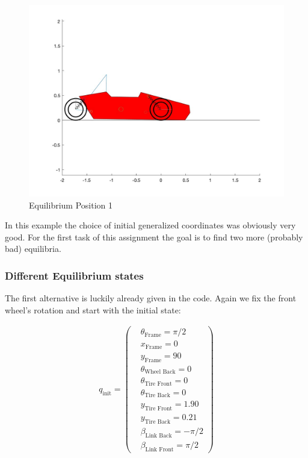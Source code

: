 \begin{figure}[ht]
    \centering
    \includegraphics[scale=0.235]{images/Equilibrium1.jpg}
    \caption{Equilibrium Position 1}
    \label{fig:eq_1}
\end{figure}

\noindent In this example the choice of initial generalized coordinates was obviously very good. For the first task of this assignment the goal is to find two more (probably bad) equilibria.



\subsubsection{Different Equilibrium states}

The first alternative is luckily already given in the code. Again we fix the front wheel's rotation and start with the initial state:

\begin{equation}\label{eq:4.5.3}
    \begin{split}
        q_{\text{init}} = 
        \begin{pmatrix}
            &\theta_{\text{Frame}} = \pi/2\\
            &x_{\text{Frame}} = 0\\
            &y_{\text{Frame}} = 90\\
            &\theta_{\text{Wheel Back}} = 0\\
            &\theta_{\text{Tire Front}} = 0\\
            &\theta_{\text{Tire Back}} = 0\\
            &y_{\text{Tire Front}} = 1.90\\
            &y_{\text{Tire Back}} = 0.21\\
            &\beta_{\text{Link Back}} = -\pi/2\\
            &\beta_{\text{Link Front}} = \pi/2
        \end{pmatrix}
    \end{split}
\end{equation}

